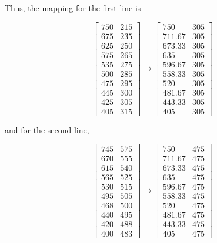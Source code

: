 \documentclass[11pt,a4paper]{article}
\begin{document}
Thus, the mapping for the first line is

\begin{equation}
	\begin{bmatrix}
		750 & 215 \\
		675 & 235 \\
		625 & 250 \\
		575 & 265 \\
		535 & 275 \\
		500 & 285 \\
		475 & 295 \\
		445 & 300 \\
		425 & 305 \\
		405 & 315
	\end{bmatrix}
	\longrightarrow
	\begin{bmatrix}
		750 & 305 \\
		711.67 & 305 \\
		673.33 & 305 \\
		635 & 305 \\
		596.67 & 305 \\
		558.33 & 305 \\
		520 & 305 \\
		481.67 & 305 \\
		443.33 & 305 \\
		405 & 305
	\end{bmatrix}
\end{equation}

and for the second line,

\begin{equation}
	\begin{bmatrix}
		745 & 575 \\
		670 & 555 \\
		615 & 540 \\
		565 & 525 \\
		530 & 515 \\
		495 & 505 \\
		468 & 500 \\
		440 & 495 \\
		420 & 488 \\
		400 & 483
	\end{bmatrix}
	\longrightarrow
	\begin{bmatrix}
		750 & 475 \\
		711.67 & 475 \\
		673.33 & 475 \\
		635 & 475 \\
		596.67 & 475 \\
		558.33 & 475 \\
		520 & 475 \\
		481.67 & 475 \\
		443.33 & 475 \\
		405 & 475
	\end{bmatrix}
\end{equation}
\end{document}
